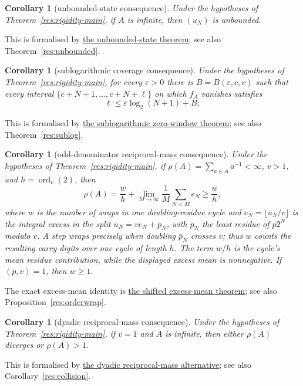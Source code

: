 \documentclass[11pt]{article}
\newcommand{\commit}{bb4e24651b37cd096d3749ef299c3317930b3a3b}
\newcommand{\repobase}{https://github.com/wcook04/plectis-lean-erdos249-257/blob/\commit}
\newcommand{\PK}{Erdos249257}
\newcommand{\lword}[4]{\href{\repobase/\PK/#1\#L#2}{#4}}
\newtheorem{corollary}[theorem]{Corollary}
\theoremstyle{definition}
\theoremstyle{remark}
\begin{document}
\begin{corollary}[unbounded-state consequence]
\label{res:rigidity-unbounded-main}
Under the hypotheses of Theorem~\ref{res:rigidity-main}, if \(A\) is
infinite, then \((u_N)\) is unbounded.
\end{corollary}
\noindent This is formalised by
\lword{RationalSupportCarrySkeleton.lean}{2383}{exists_unbounded_shifted_odd_tail_nat_state_of_support_fraction}{the unbounded-state theorem};
see also Theorem~\ref{res:unbounded}.

\begin{corollary}[sublogarithmic coverage consequence]
\label{res:rigidity-sublog-main}
Under the hypotheses of Theorem~\ref{res:rigidity-main}, for every
\(\varepsilon>0\) there is
\(B=B(\varepsilon,c,v)\) such that every interval
\(\{c+N+1,\ldots,c+N+\ell\}\) on which \(f_A\) vanishes satisfies
\[
 \ell\leq\varepsilon\log_2(N+1)+B;
\]
\end{corollary}
\noindent This is formalised by
\lword{SublogDivisorCoverage.lean}{392}{supportCoeffZeroWindow_length_le_eps_logb_add}{the sublogarithmic zero-window theorem};
see also Theorem~\ref{res:sublog}.

\begin{corollary}[odd-denominator reciprocal-mass consequence]
\label{res:rigidity-mass-main}
Under the hypotheses of Theorem~\ref{res:rigidity-main}, if
\(\rho(A)=\sum_{a\in A}a^{-1}<\infty\), \(v>1\), and
\(h=\operatorname{ord}_v(2)\), then
\[
 \rho(A)=\frac{w}{h}
   +\lim_{M\to\infty}\frac1M\sum_{N<M}e_N\geq\frac{w}{h},
\]
where \(w\) is the number of wraps in one doubling-residue cycle and
\(e_N=\lfloor u_N/v\rfloor\) is the integral excess in the split
\(u_N=ve_N+\bar p_N\), with \(\bar p_N\) the least residue of
\(p2^N\) modulo \(v\).  A step wraps precisely when doubling
\(\bar p_N\) crosses \(v\); thus \(w\) counts the resulting carry digits
over one cycle of length \(h\).  The term \(w/h\) is the cycle's mean
residue contribution, while the displayed excess mean is nonnegative.  If
\((p,v)=1\), then \(w\geq1\).
\end{corollary}
\noindent The exact excess-mean identity is
\lword{RationalSupportCarrySkeleton.lean}{1579}{exists_shifted_oddTailExcess_mean_of_support_fraction}{the shifted excess-mean theorem};
see also Proposition~\ref{res:orderwrap}.

\begin{corollary}[dyadic reciprocal-mass consequence]
\label{res:rigidity-dyadic-mass-main}
Under the hypotheses of Theorem~\ref{res:rigidity-main}, if \(v=1\) and
\(A\) is infinite, then either \(\rho(A)\) diverges or \(\rho(A)>1\).
\end{corollary}
\noindent This is formalised by
\lword{RationalSupportCarrySkeleton.lean}{2210}{dyadic_support_fraction_reciprocalMass_diverges_or_gt_one}{the dyadic reciprocal-mass alternative};
see also Corollary~\ref{res:collision}.
\end{document}
